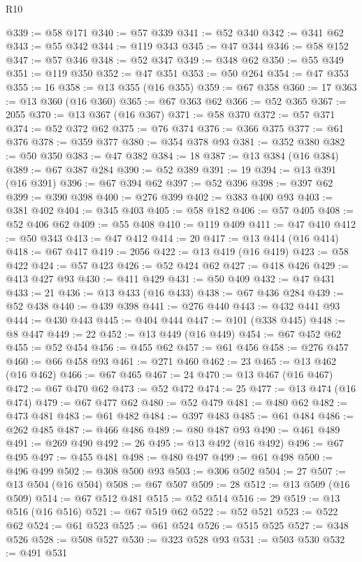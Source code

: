 \begin{lexlean}{R10}
\begin{coremodule}
@339 := @58 @171
@340 := @57 @339
@341 := @52 @340
@342 := @341 @62
@343 := @55 @342
@344 := @119 @343
@345 := @47 @344
@346 := @58 @152
@347 := @57 @346
@348 := @52 @347
@349 := @348 @62
@350 := @55 @349
@351 := @119 @350
@352 := @47 @351
@353 := @50 @264
@354 := @47 @353
@355 := 16
@358 := @13 @355 (@16 @355)
@359 := @67 @358
@360 := 17
@363 := @13 @360 (@16 @360)
@365 := @67 @363 @62
@366 := @52 @365
@367 := 2055
@370 := @13 @367 (@16 @367)
@371 := @58 @370
@372 := @57 @371
@374 := @52 @372 @62
@375 := @76 @374
@376 := @366 @375
@377 := @61 @376
@378 := @359 @377
@380 := @354 @378 @93
@381 := @352 @380
@382 := @50 @350
@383 := @47 @382
@384 := 18
@387 := @13 @384 (@16 @384)
@389 := @67 @387 @284
@390 := @52 @389
@391 := 19
@394 := @13 @391 (@16 @391)
@396 := @67 @394 @62
@397 := @52 @396
@398 := @397 @62
@399 := @390 @398
@400 := @276 @399
@402 := @383 @400 @93
@403 := @381 @402
@404 := @345 @403
@405 := @58 @182
@406 := @57 @405
@408 := @52 @406 @62
@409 := @55 @408
@410 := @119 @409
@411 := @47 @410
@412 := @50 @343
@413 := @47 @412
@414 := 20
@417 := @13 @414 (@16 @414)
@418 := @67 @417
@419 := 2056
@422 := @13 @419 (@16 @419)
@423 := @58 @422
@424 := @57 @423
@426 := @52 @424 @62
@427 := @418 @426
@429 := @413 @427 @93
@430 := @411 @429
@431 := @50 @409
@432 := @47 @431
@433 := 21
@436 := @13 @433 (@16 @433)
@438 := @67 @436 @284
@439 := @52 @438
@440 := @439 @398
@441 := @276 @440
@443 := @432 @441 @93
@444 := @430 @443
@445 := @404 @444
@447 := @101 (@338 @445)
@448 := @8 @447
@449 := 22
@452 := @13 @449 (@16 @449)
@454 := @67 @452 @62
@455 := @52 @454
@456 := @455 @62
@457 := @61 @456
@458 := @276 @457
@460 := @66 @458 @93
@461 := @271 @460
@462 := 23
@465 := @13 @462 (@16 @462)
@466 := @67 @465
@467 := 24
@470 := @13 @467 (@16 @467)
@472 := @67 @470 @62
@473 := @52 @472
@474 := 25
@477 := @13 @474 (@16 @474)
@479 := @67 @477 @62
@480 := @52 @479
@481 := @480 @62
@482 := @473 @481
@483 := @61 @482
@484 := @397 @483
@485 := @61 @484
@486 := @262 @485
@487 := @466 @486
@489 := @80 @487 @93
@490 := @461 @489
@491 := @269 @490
@492 := 26
@495 := @13 @492 (@16 @492)
@496 := @67 @495
@497 := @455 @481
@498 := @480 @497
@499 := @61 @498
@500 := @496 @499
@502 := @308 @500 @93
@503 := @306 @502
@504 := 27
@507 := @13 @504 (@16 @504)
@508 := @67 @507
@509 := 28
@512 := @13 @509 (@16 @509)
@514 := @67 @512 @481
@515 := @52 @514
@516 := 29
@519 := @13 @516 (@16 @516)
@521 := @67 @519 @62
@522 := @52 @521
@523 := @522 @62
@524 := @61 @523
@525 := @61 @524
@526 := @515 @525
@527 := @348 @526
@528 := @508 @527
@530 := @323 @528 @93
@531 := @503 @530
@532 := @491 @531

\end{coremodule}
\end{lexlean}
